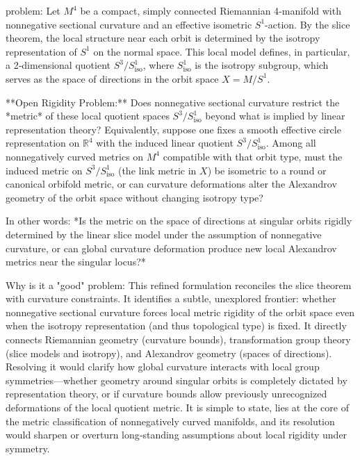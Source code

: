 problem:  
Let \(M^4\) be a compact, simply connected Riemannian 4‑manifold with nonnegative sectional curvature and an effective isometric \(S^1\)-action. By the slice theorem, the local structure near each orbit is determined by the isotropy representation of \(S^1\) on the normal space. This local model defines, in particular, a 2‑dimensional quotient \(S^3/S^1_\text{iso}\), where \(S^1_\text{iso}\) is the isotropy subgroup, which serves as the space of directions in the orbit space \(X=M/S^1\).

**Open Rigidity Problem:**  
Does nonnegative sectional curvature restrict the *metric* of these local quotient spaces \(S^3/S^1_\text{iso}\) beyond what is implied by linear representation theory?  
Equivalently, suppose one fixes a smooth effective circle representation on \(\mathbb{R}^4\) with the induced linear quotient \(S^3/S^1_\text{iso}\). Among all nonnegatively curved metrics on \(M^4\) compatible with that orbit type, must the induced metric on \(S^3/S^1_\text{iso}\) (the link metric in \(X\)) be isometric to a round or canonical orbifold metric, or can curvature deformations alter the Alexandrov geometry of the orbit space without changing isotropy type?  

In other words: *Is the metric on the space of directions at singular orbits rigidly determined by the linear slice model under the assumption of nonnegative curvature, or can global curvature deformation produce new local Alexandrov metrics near the singular locus?*  

Why is it a "good" problem:  
This refined formulation reconciles the slice theorem with curvature constraints. It identifies a subtle, unexplored frontier: whether nonnegative sectional curvature forces local metric rigidity of the orbit space even when the isotropy representation (and thus topological type) is fixed. It directly connects Riemannian geometry (curvature bounds), transformation group theory (slice models and isotropy), and Alexandrov geometry (spaces of directions). Resolving it would clarify how global curvature interacts with local group symmetries—whether geometry around singular orbits is completely dictated by representation theory, or if curvature bounds allow previously unrecognized deformations of the local quotient metric. It is simple to state, lies at the core of the metric classification of nonnegatively curved manifolds, and its resolution would sharpen or overturn long‑standing assumptions about local rigidity under symmetry.